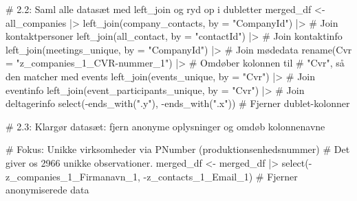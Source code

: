 \documentclass[
  11pt,
  letterpaper,
  DIV=11,
  numbers=noendperiod]{scrartcl}
\newenvironment{Shaded}{\begin{snugshade}}{\end{snugshade}}
\newcommand{\AttributeTok}[1]{\textcolor[rgb]{0.40,0.45,0.13}{#1}}
\newcommand{\CommentTok}[1]{\textcolor[rgb]{0.37,0.37,0.37}{#1}}
\newcommand{\FunctionTok}[1]{\textcolor[rgb]{0.28,0.35,0.67}{#1}}
\newcommand{\NormalTok}[1]{\textcolor[rgb]{0.00,0.23,0.31}{#1}}
\newcommand{\OtherTok}[1]{\textcolor[rgb]{0.00,0.23,0.31}{#1}}
\newcommand{\SpecialCharTok}[1]{\textcolor[rgb]{0.37,0.37,0.37}{#1}}
\newcommand{\StringTok}[1]{\textcolor[rgb]{0.13,0.47,0.30}{#1}}
\begin{document}
\begin{Shaded}
\begin{Highlighting}[]
\CommentTok{\# 2.2: Saml alle datasæt med left\_join og ryd op i dubletter}
\NormalTok{merged\_df }\OtherTok{\textless{}{-}}\NormalTok{ all\_companies }\SpecialCharTok{|\textgreater{}} 
  \FunctionTok{left\_join}\NormalTok{(company\_contacts, }\AttributeTok{by =} \StringTok{"CompanyId"}\NormalTok{) }\SpecialCharTok{|\textgreater{}}     \CommentTok{\# Join kontaktpersoner}
  \FunctionTok{left\_join}\NormalTok{(all\_contact, }\AttributeTok{by =} \StringTok{"contactId"}\NormalTok{) }\SpecialCharTok{|\textgreater{}}          \CommentTok{\# Join kontaktinfo}
  \FunctionTok{left\_join}\NormalTok{(meetings\_unique, }\AttributeTok{by =} \StringTok{"CompanyId"}\NormalTok{) }\SpecialCharTok{|\textgreater{}}      \CommentTok{\# Join mødedata}
  \FunctionTok{rename}\NormalTok{(}\AttributeTok{Cvr =} \StringTok{"z\_companies\_1\_CVR{-}nummer\_1"}\NormalTok{) }\SpecialCharTok{|\textgreater{}}        \CommentTok{\# Omdøber kolonnen til }
                                              \CommentTok{\# "Cvr", så den matcher med events}
  \FunctionTok{left\_join}\NormalTok{(events\_unique, }\AttributeTok{by =} \StringTok{"Cvr"}\NormalTok{) }\SpecialCharTok{|\textgreater{}}              \CommentTok{\# Join eventinfo}
  \FunctionTok{left\_join}\NormalTok{(event\_participants\_unique, }\AttributeTok{by =} \StringTok{"Cvr"}\NormalTok{) }\SpecialCharTok{|\textgreater{}}  \CommentTok{\# Join deltagerinfo}
  \FunctionTok{select}\NormalTok{(}\SpecialCharTok{{-}}\FunctionTok{ends\_with}\NormalTok{(}\StringTok{".y"}\NormalTok{), }\SpecialCharTok{{-}}\FunctionTok{ends\_with}\NormalTok{(}\StringTok{".x"}\NormalTok{))           }\CommentTok{\# Fjerner dublet{-}kolonner}


\CommentTok{\# 2.3: Klargør datasæt: fjern anonyme oplysninger og omdøb kolonnenavne}

\CommentTok{\# Fokus: Unikke virksomheder via PNumber (produktionsenhedsnummer)}
\CommentTok{\# Det giver os 2966 unikke observationer.}
\NormalTok{merged\_df }\OtherTok{\textless{}{-}}\NormalTok{ merged\_df }\SpecialCharTok{|\textgreater{}} 
  \FunctionTok{select}\NormalTok{(}\SpecialCharTok{{-}}\NormalTok{z\_companies\_1\_Firmanavn\_1, }\SpecialCharTok{{-}}\NormalTok{z\_contacts\_1\_Email\_1)  }
\CommentTok{\# Fjerner anonymiserede data}


\end{Highlighting}
\end{Shaded}
\end{document}

